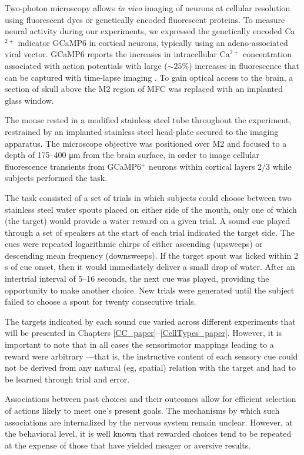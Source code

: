 Two-photon microscopy allows \emph{in vivo} imaging of neurons at cellular resolution using fluorescent dyes or genetically encoded fluorescent proteins. To measure neural activity during our experiments, we expressed the genetically encoded Ca$^{2+}$ indicator GCaMP6 in cortical neurons, typically using an adeno-associated viral vector. GCaMP6 reports the increases in intracellular Ca$^{2+}$ concentration associated with action potentials with large ($\sim 25\%$) increases in fluorescence that can be captured with time-lapse imaging \citep{chen2013ultrasensitive}. To gain optical access to the brain, a section of skull above the M2 region of MFC was replaced with an implanted glass window.

The mouse rested in a modified stainless steel tube throughout the experiment, restrained by an implanted stainless steel head-plate secured to the imaging apparatus. The microscope objective was positioned over M2 and focused to a depth of 175--400 \si{\um} from the brain surface, in order to image cellular fluorescence transients from GCaMP6$^+$ neurons within cortical layers 2/3 while subjects performed the task.

The task consisted of a set of trials in which subjects could choose between two stainless steel water spouts placed on either side of the mouth, only one of which (the target) would provide a water reward on a given trial. A sound cue played through a set of speakers at the start of each trial indicated the target side. The cues were repeated logarithmic chirps of either ascending (upsweeps) or descending mean frequency (downsweeps).  If the target spout was licked within 2 s of cue onset, then it would immediately deliver a small drop of water. After an intertrial interval of 5--16 seconds, the next cue was played, providing the opportunity to make another choice. New trials were generated until the subject failed to choose a spout for twenty consecutive trials. 

The targets indicated by each sound cue varied across different experiments that will be presented in Chapters \ref{CC_paper}--\ref{CellTypes_paper}. However, it is important to note that in all cases the sensorimotor mappings leading to a reward were arbitrary \citep{white1999rule,wise2000arbitrary}---that is, the instructive content of each sensory cue could not be derived from any natural (eg, spatial) relation with the target and had to be learned through trial and error. 

Associations between past choices and their outcomes allow for efficient selection of actions likely to meet one’s present goals. The mechanisms by which such associations are internalized by the nervous system remain unclear. However, at the behavioral level, it is well known that rewarded choices tend to be repeated at the expense of those that have yielded meager or aversive results. 

